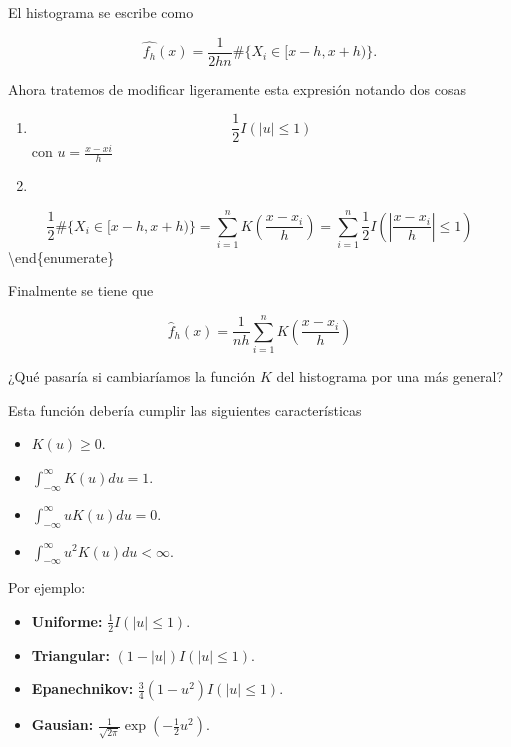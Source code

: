 \documentclass[
  12pt,
]{book}
\providecommand{\tightlist}{%
  \setlength{\itemsep}{0pt}\setlength{\parskip}{0pt}}
\theoremstyle{definition}
\theoremstyle{definition}
\theoremstyle{definition}
\theoremstyle{remark}
\let\BeginKnitrBlock\begin \let\EndKnitrBlock\end
\begin{document}
El histograma se escribe como

\begin{equation*}
\hat{f_{h}}(x) = \dfrac{1}{2hn} \# \{ X_i \in [x-h,x+h) \}.
\end{equation*}

Ahora tratemos de modificar ligeramente esta expresión notando dos cosas

\begin{enumerate}
\def\labelenumi{\arabic{enumi}.}
\item
  \begin{equation*}
  \frac{1}{2} I \left( \left\vert u \right\vert \leq 1 \right)
  \end{equation*}
  con \(u = \frac{x-xi}{h}\)
\item
\end{enumerate}

\begin{equation*}
\frac{1}{2}\# \{ X_i \in [x-h,x+h) \}
=\sum_{i=1}^{n} K\left( \frac{x-x_{i}}{h} \right)
=\sum_{i=1}^{n}  \frac{1}{2} I \left( \left\vert \frac{x-x_{i}}{h}
\right\vert \leq 1 \right)
\end{equation*}
\textbackslash end\{enumerate\}

Finalmente se tiene que

\begin{equation*}
\hat{f}_{h}\left( x \right) = \frac{1}{nh}\sum_{i=1}^{n} K\left( \frac{x-x_{i}}{h} \right)
\end{equation*}

\BeginKnitrBlock{remark}
{}¿Qué pasaría si cambiaríamos la función \(K\) del histograma por una más general?
\EndKnitrBlock{remark}

Esta función debería cumplir las siguientes características

\begin{itemize}
\tightlist
\item
  \(K(u)\geq 0\).
\item
  \(\int_{-\infty}^{\infty} K(u)du = 1\).
\item
  \(\int_{-\infty}^{\infty} u K(u)du = 0\).
\item
  \(\int_{-\infty}^{\infty} u^{2} K(u)du <\infty\).
\end{itemize}

Por ejemplo:

\begin{itemize}
\tightlist
\item
  \textbf{Uniforme:} \(\frac{1}{2} I \left( \left\vert u \right\vert \leq 1 \right)\).
\item
  \textbf{Triangular:} \((1-|u|) I \left( \left\vert u \right\vert \leq 1 \right)\).
\item
  \textbf{Epanechnikov:} \(\frac{3}{4} (1-u^{2}) I \left( \left\vert u \right\vert \leq 1 \right)\).
\item
  \textbf{Gausian:} \(\frac{1}{\sqrt{2\pi}} \exp \left( -\frac{1}{2}u^{2} \right)\).
\end{itemize}
\end{document}
